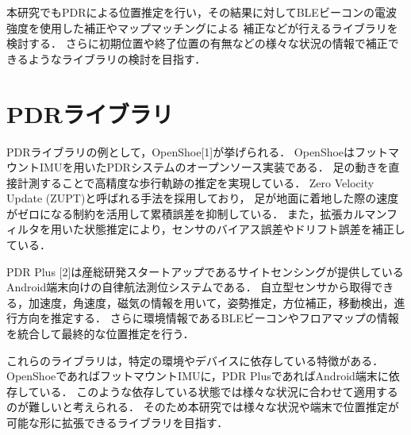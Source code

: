 本研究でもPDRによる位置推定を行い，その結果に対してBLEビーコンの電波強度を使用した補正やマップマッチングによる
補正などが行えるライブラリを検討する．
さらに初期位置や終了位置の有無などの様々な状況の情報で補正できるようなライブラリの検討を目指す．



\section{PDRライブラリ}
PDRライブラリの例として，OpenShoe[1]が挙げられる．
OpenShoeはフットマウントIMUを用いたPDRシステムのオープンソース実装である．
足の動きを直接計測することで高精度な歩行軌跡の推定を実現している．
Zero Velocity Update (ZUPT)と呼ばれる手法を採用しており，
足が地面に着地した際の速度がゼロになる制約を活用して累積誤差を抑制している．
また，拡張カルマンフィルタを用いた状態推定により，センサのバイアス誤差やドリフト誤差を補正している．

PDR Plus [2]は産総研発スタートアップであるサイトセンシングが提供しているAndroid端末向けの自律航法測位システムである．
自立型センサから取得できる，加速度，角速度，磁気の情報を用いて，姿勢推定，方位補正，移動検出，進行方向を推定する．
さらに環境情報であるBLEビーコンやフロアマップの情報を統合して最終的な位置推定を行う．

これらのライブラリは，特定の環境やデバイスに依存している特徴がある．
OpenShoeであればフットマウントIMUに，PDR PlusであればAndroid端末に依存している．
このような依存している状態では様々な状況に合わせて適用するのが難しいと考えられる．
そのため本研究では様々な状況や端末で位置推定が可能な形に拡張できるライブラリを目指す．
